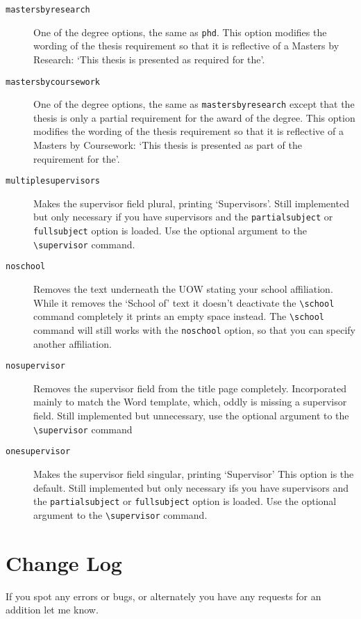 \documentclass[12pt,oneside]{article}
\newcommand{\oporcom}[1]{\texttt{\color{RoyalBlue}#1}} %
\begin{document}
\begin{description}
    \item[\oporcom{mastersbyresearch}]
    One of the degree options, the same as \oporcom{phd}. This option modifies the wording of the thesis requirement so that it is reflective of a Masters by Research: `This thesis is presented as required for the'.
    
    \item[\oporcom{mastersbycoursework}]
    One of the degree options, the same as \oporcom{mastersbyresearch} except that the thesis is only a partial requirement for the award of the degree. This option modifies the wording of the thesis requirement so that it is reflective of a Masters by Coursework: `This thesis is presented as part of the requirement for the'.
    
    \item[\oporcom{multiplesupervisors}]
    Makes the supervisor field plural, printing `Supervisors'. Still implemented but only necessary if you have supervisors and the \oporcom{partialsubject} or \oporcom{fullsubject} option is loaded. Use the optional argument to the \oporcom{\textbackslash{}supervisor} command.
    
    \item[\oporcom{noschool}]
    Removes the text underneath the UOW stating your school affiliation. While it removes the `School of' text it doesn't deactivate the \oporcom{\textbackslash{}school} command completely it prints an empty space instead. The \oporcom{\textbackslash{}school} command will still works with the \oporcom{noschool} option, so that you can specify another affiliation.
    
    \item[\oporcom{nosupervisor}]
    Removes the supervisor field from the title page completely. Incorporated mainly to match the Word template, which, oddly is missing a supervisor field. Still implemented but unnecessary, use the optional argument to the \oporcom{\textbackslash{}supervisor} command
    
    \item[\oporcom{onesupervisor}]
    Makes the supervisor field singular, printing `Supervisor' This option is the default. Still implemented but only necessary ifs you have supervisors and the \oporcom{partialsubject} or \oporcom{fullsubject} option is loaded. Use the optional argument to the \oporcom{\textbackslash{}supervisor} command.
    
\end{description}

\section{Change Log}
If you spot any errors or bugs, or alternately you have any requests for an addition let me know.
\end{document}
